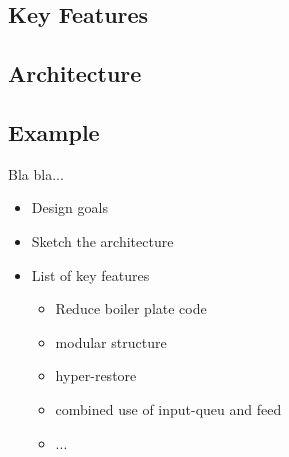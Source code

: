 \subsection{Key Features}



\subsection{Architecture}


\subsection{Example}



Bla bla...

\begin{itemize}
\item Design goals
\item Sketch the architecture
\item List of key features
	\begin{itemize}
	\item Reduce boiler plate code
	\item modular structure
	\item hyper-restore
	\item combined use of input-queu and feed
	\item ...
	\end{itemize}
\end{itemize}
